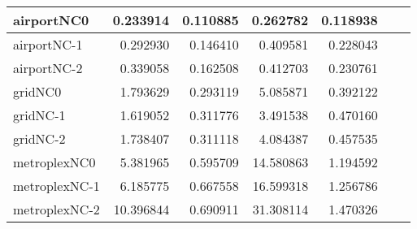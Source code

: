 \begin{longtable}{|l|r|r|r|r|r|r|}
airportNC0 & 0.233914 & 0.110885 & 0.262782 & 0.118938 \\ \hline
airportNC-1 & 0.292930 & 0.146410 & 0.409581 & 0.228043 \\ \hline
airportNC-2 & 0.339058 & 0.162508 & 0.412703 & 0.230761 \\ \hline
gridNC0 & 1.793629 & 0.293119 & 5.085871 & 0.392122 \\ \hline
gridNC-1 & 1.619052 & 0.311776 & 3.491538 & 0.470160 \\ \hline
gridNC-2 & 1.738407 & 0.311118 & 4.084387 & 0.457535 \\ \hline
metroplexNC0 & 5.381965 & 0.595709 & 14.580863 & 1.194592 \\ \hline
metroplexNC-1 & 6.185775 & 0.667558 & 16.599318 & 1.256786 \\ \hline
metroplexNC-2 & 10.396844 & 0.690911 & 31.308114 & 1.470326 \\ \hline
\end{longtable}
